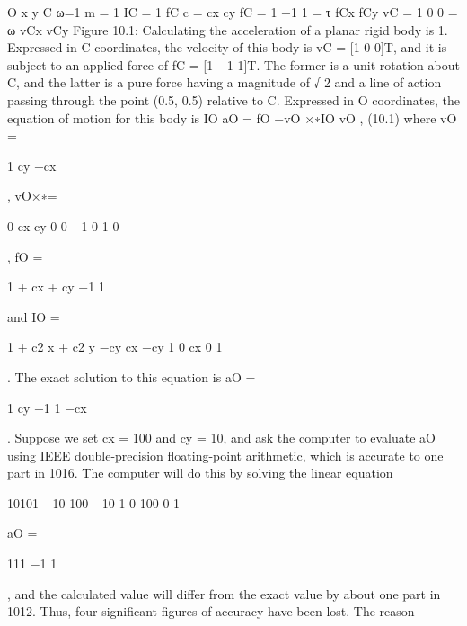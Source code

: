 \label{sec:10.1}
O x y C ω=1 m = 1 IC = 1 fC c = cx cy fC = 1 −1 1 = τ fCx fCy vC = 1 0 0 = ω vCx vCy Figure 10.1: Calculating the acceleration of a planar rigid body is 1. Expressed in C coordinates, the velocity of this body is vC = [1 0 0]T, and it is subject to an applied force of fC = [1 −1 1]T. The former is a unit rotation about C, and the latter is a pure force having a magnitude of √ 2 and a line of action passing through the point (0.5, 0.5) relative to C. Expressed in O coordinates, the equation of motion for this body is IO aO = fO −vO ×∗IO vO , (10.1) where vO =

1 cy −cx

, vO×∗=

0 cx cy 0 0 −1 0 1 0

, fO =

1 + cx + cy −1 1

and IO =

1 + c2 x + c2 y −cy cx −cy 1 0 cx 0 1

. The exact solution to this equation is aO =

1 cy −1 1 −cx

. Suppose we set cx = 100 and cy = 10, and ask the computer to evaluate aO using IEEE double-precision floating-point arithmetic, which is accurate to one part in 1016. The computer will do this by solving the linear equation

10101 −10 100 −10 1 0 100 0 1

aO =

111 −1 1

, and the calculated value will differ from the exact value by about one part in 1012. Thus, four significant figures of accuracy have been lost. The reason

